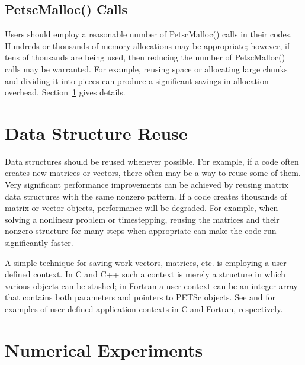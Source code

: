 {{\subsection{PetscMalloc() Calls}
Users should employ a reasonable number of PetscMalloc() calls in their codes.
Hundreds or thousands of memory allocations may be appropriate; however, if tens of 
thousands are being used, then reducing the number of PetscMalloc() calls
may be warranted.  For example, reusing space or allocating large chunks 
and dividing it into pieces can produce a significant savings in 
allocation overhead.  Section~\ref{sec_dsreuse} gives details.

\section{Data Structure Reuse}
\label{sec_dsreuse}

Data structures should be reused whenever possible.  For example, if a code often
creates new matrices or vectors, there often may be a way to reuse some
of them.  Very significant performance improvements can be achieved by
reusing matrix data structures with the same nonzero pattern.  If a code
creates thousands of matrix or vector objects, performance will be
degraded.  For example, when solving a nonlinear problem or timestepping,
reusing the matrices and their nonzero structure for many steps when
 appropriate can make the code run significantly faster.  

A simple technique for saving work vectors, matrices, etc. is employing
a user-defined context.  In C and C++ such a context is merely a
structure in which various objects can be stashed; in Fortran a user
context can be an integer array that contains both parameters and pointers
to PETSc objects. See  and 
 for examples of user-defined application
contexts in C and Fortran, respectively.

\section{Numerical Experiments}

}}
